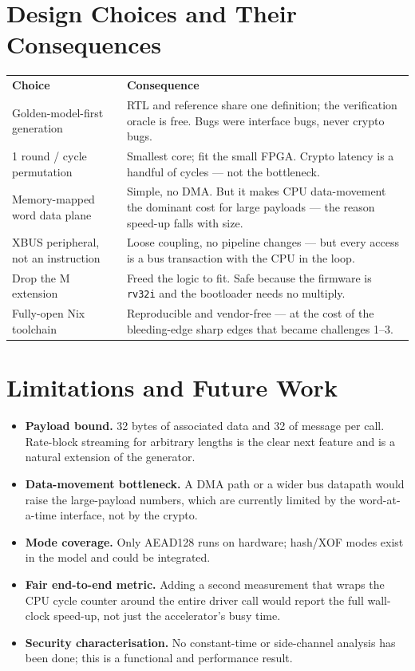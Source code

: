 \documentclass[11pt,a4paper]{article}
\newcommand{\thd}[1]{\cellcolor{tabhead}\color{white}\textbf{\small #1}}
\newcommand{\trow}{\rowcolor{rowalt}}
\newcommand{\code}[1]{\texttt{\small #1}}
\begin{document}
\section{Design Choices and Their Consequences}
\renewcommand{\arraystretch}{1.3}
\begin{center}
\begin{tabular}{L{4.4cm} L{9.2cm}}
\thd{Choice} & \thd{Consequence}\\
\trow Golden-model-first generation & RTL and reference share one definition;
    the verification oracle is free. Bugs were interface bugs, never crypto bugs.\\
1 round / cycle permutation & Smallest core; fit the small FPGA. Crypto latency is
    a handful of cycles --- not the bottleneck.\\
\trow Memory-mapped word data plane & Simple, no DMA. But it makes CPU
    data-movement the dominant cost for large payloads --- the reason speed-up
    falls with size.\\
XBUS peripheral, not an instruction & Loose coupling, no pipeline changes ---
    but every access is a bus transaction with the CPU in the loop.\\
\trow Drop the M extension & Freed the logic to fit. Safe because the firmware is
    \code{rv32i} and the bootloader needs no multiply.\\
Fully-open Nix toolchain & Reproducible and vendor-free --- at the cost of the
    bleeding-edge sharp edges that became challenges 1--3.\\
\end{tabular}
\end{center}
\renewcommand{\arraystretch}{1}

\section{Limitations and Future Work}
\begin{itemize}
\item \textbf{Payload bound.} 32 bytes of associated data and 32 of message per
      call. Rate-block streaming for arbitrary lengths is the clear next feature
      and is a natural extension of the generator.
\item \textbf{Data-movement bottleneck.} A DMA path or a wider bus datapath would
      raise the large-payload numbers, which are currently limited by the
      word-at-a-time interface, not by the crypto.
\item \textbf{Mode coverage.} Only AEAD128 runs on hardware; hash/XOF modes exist
      in the model and could be integrated.
\item \textbf{Fair end-to-end metric.} Adding a second measurement that wraps the
      CPU cycle counter around the entire driver call would report the full
      wall-clock speed-up, not just the accelerator's busy time.
\item \textbf{Security characterisation.} No constant-time or side-channel
      analysis has been done; this is a functional and performance result.
\end{itemize}
\end{document}
